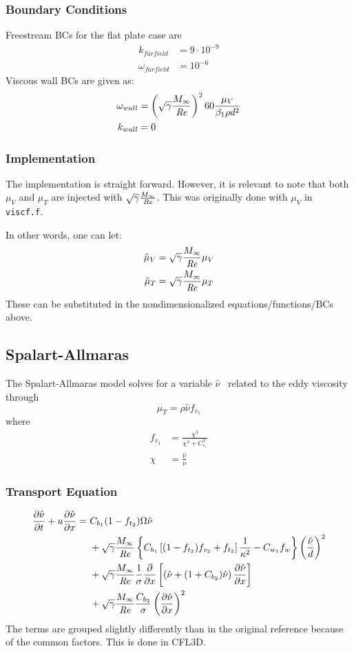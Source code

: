 \documentclass{SelimArticle}
\begin{document}
\subsubsection{Boundary Conditions}
Freestream BCs for the flat plate case are
\begin{align}
    k_{farfield} &= 9\cdot10^{-9}\\
    \omega_{farfield} &= 10^{-6}
\end{align}
Viscous wall BCs are given as:
\begin{align}
    \omega_{wall} &= \left( \sqrt{\gamma}\frac{M_\infty}{\mathit{Re}} \right)^2 60\frac{\mu_V}{\beta_1\rho d^2}\\
    k_{wall} &= 0
\end{align}

\subsubsection{Implementation}
The implementation is straight forward. However, it is relevant to note that both
$\mu_V$ and $\mu_T$ are injected with $ \sqrt{\gamma}\frac{M_\infty}{\mathit{Re}} $. This was originally done with $\mu_V$ in
\texttt{viscf.f}.

In other words, one can let:
\begin{align}
    \hat{\mu}_V &=  \sqrt{\gamma}\frac{M_\infty}{\mathit{Re}} \mu_V\\
    \hat{\mu}_T &=  \sqrt{\gamma}\frac{M_\infty}{\mathit{Re}} \mu_T
\end{align}
These can be substituted in the nondimensionalized equations/functions/BCs above.

\subsection{Spalart-Allmaras}
\newcommand{\sa}{\ensuremath{\hat{\nu}}}
The Spalart-Allmaras model solves for a variable \sa ~ related to the eddy viscosity
through
\begin{equation}
    \mu_T = \rho\sa f_{v_1}
\end{equation}
where
\begin{align}
    f_{v_1} &= \frac{\chi^3}{\chi^3 + C_{v_1}^3}\\
    \chi &= \frac{\sa}{\nu}
\end{align}
\subsubsection{Transport Equation}
\begin{align}
\begin{split}
    \diff{\sa}{t} + u\diff{\sa}{x} =~ &C_{b_1}(1 - f_{t_2})\Omega\sa\\
        &+ \cmu\left\{
            C_{b_1}\left[(1 - f_{t_2})f_{v_2} + f_{t_2}\right]\frac{1}{\kappa^2} - C_{w_1}f_w
        \right\} \left(\frac{\sa}{d}\right)^2\\
        &+ \cmu \frac{1}{\sigma}\diff{}{x}\left[
            \left(\sa + (1 + C_{b_2})\sa\right)\diff{\sa}{x}
        \right]\\
        &+ \cmu \frac{C_{b_2}}{\sigma}\left(\diff{\sa}{x}\right)^2
\end{split}
\end{align}
The terms are grouped slightly differently than in the original reference because of the common
factors. This is done in CFL3D.
\end{document}
